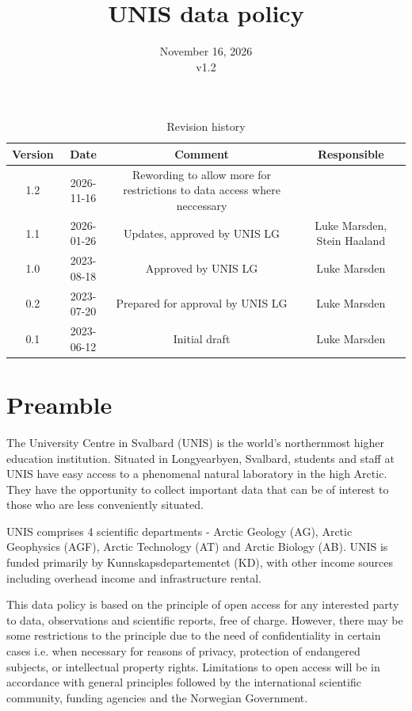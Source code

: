 \documentclass[a4paper,english, 11pt]{article}
\title{UNIS data policy}
\date{November 16, 2026 \\v1.2}
\begin{document}
\maketitle
\begin{table}[b]
\centering
\caption{Revision history}
\begin{tabular}{cccc}
\toprule
Version & Date       & Comment                                      & Responsible \\
\midrule
1.2       & 2026-11-16 & Rewording to allow more for restrictions to data access where neccessary   \\
1.1       & 2026-01-26 & Updates, approved by UNIS LG & Luke Marsden, Stein Haaland     \\
1.0       & 2023-08-18 & Approved by UNIS LG & Luke Marsden     \\
0.2       & 2023-07-20 & Prepared for approval by UNIS LG & Luke Marsden     \\
0.1     & 2023-06-12 & Initial draft & Luke Marsden     \\
\bottomrule
\end{tabular}
\end{table}
\newpage
\tableofcontents

\newpage

\section{Preamble}
\label{s:preamble}

The University Centre in Svalbard (UNIS) is the world's northernmost higher education institution. Situated in Longyearbyen, Svalbard, students and staff at UNIS have easy access to a phenomenal natural laboratory in the high Arctic. They have the opportunity to collect important data that can be of interest to those who are less conveniently situated.

UNIS comprises 4 scientific departments - Arctic Geology (AG), Arctic Geophysics (AGF), Arctic Technology (AT) and Arctic Biology (AB). UNIS is funded primarily by Kunnskapsdepartementet (KD), with other income sources including overhead income and infrastructure rental.

This data policy is based on the principle of open access for any interested party to data, observations and scientific reports, free of charge. However, there may be some restrictions to
the principle due to the need of confidentiality in certain cases i.e. when necessary for reasons
of privacy, protection of endangered subjects, or intellectual property rights. Limitations to open
access will be in accordance with general principles followed by the international scientific
community, funding agencies and the Norwegian Government.    
\end{document}
